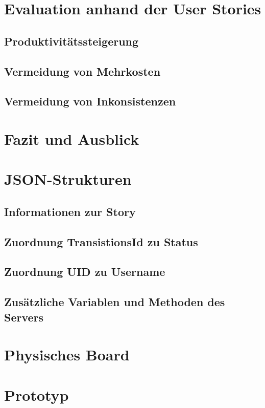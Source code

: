 \documentclass[12pt,titlepage]{scrartcl}
\begin{document}
	\section{Evaluation anhand der User Stories}
			\subsection{Produktivitätssteigerung}
			\subsection{Vermeidung von Mehrkosten}
			\subsection{Vermeidung von Inkonsistenzen}
	\newpage	
	\section{Fazit und Ausblick}
	
	\newpage
 	\begin{appendix}
 	  \section{JSON-Strukturen} \label{ANHJSON}
 	  \subsection{Informationen zur Story} \label{ANHInfStory}
 	  \subsection{Zuordnung TransistionsId zu Status} \label{ANHTransi}
 	  \subsection{Zuordnung UID zu Username} \label{ANHUser}
 	  \subsection{Zusätzliche Variablen und Methoden des Servers} \label{ANHServerHead}
 	  \section{Physisches Board} \label{ANHPhysischesBoard}
 	  \section{Prototyp}
 	\end{appendix}
 	
 	\newpage

 	
 	
\end{document}

